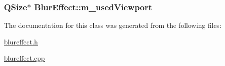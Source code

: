 \hypertarget{class_blur_effect_a8513aa58d2ff05cc6b135f60c25d0710}{
\subsubsection[{m\+\_\+used\+Viewport}]{\setlength{\rightskip}{0pt plus 5cm}Q\+Size$\ast$ Blur\+Effect\+::m\+\_\+used\+Viewport\hspace{0.3cm}{\ttfamily [protected]}}}\label{class_blur_effect_a8513aa58d2ff05cc6b135f60c25d0710}


The documentation for this class was generated from the following files\+:\begin{DoxyCompactItemize}
\item 
\hyperlink{blureffect_8h}{blureffect.\+h}\item 
\hyperlink{blureffect_8cpp}{blureffect.\+cpp}\end{DoxyCompactItemize}
